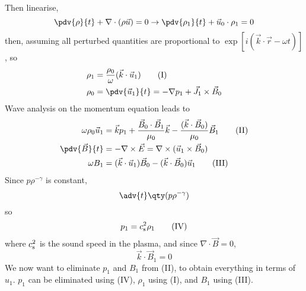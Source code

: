 \documentclass{book}         		                %
\begin{document}
Then linearise,
\[ \pdv{\rho}{t} + \nabla \cdot (\rho \vec{u}) = 0 \to \pdv{\rho_1}{t}
+ \vec{u}_0 \cdot \rho_1 = 0 \] then, assuming all perturbed
quantities are proportional to $\exp[ i(\vec{k} \cdot \vec{r} - \omega
t)]$, so
\begin{align*}
  \rho_1 &= \frac{\rho_0}{\omega} (\vec{k} \cdot \vec{u}_1) \tag{I} \\
\rho_0 &= \pdv{\vec{u}_1}{t} = - \nabla p_1 + \vec{J}_1 \times \vec{B}_0 
\end{align*}
Wave analysis on the momentum equation leads to
\begin{align*}
  \omega \rho_0 \vec{u}_1 &= \vec{k} p_1 + \frac{\vec{B}_0 \cdot \vec{B}_1}{\mu_0} \vec{k} - \frac{(\vec{k} \cdot \vec{B}_0)}{\mu_0} \vec{B}_1 \tag{II} \\
\pdv{\vec{B}}{t} &= - \nabla \times \vec{E} = \nabla \times (\vec{u}_1 \times \vec{B}_0) \\
\omega B_1 &= ( \vec{k} \cdot \vec{u}_1) \vec{B}_0 - (\vec{k} \cdot \vec{B}_0 ) \vec{u}_1 \tag{III} \\
\end{align*}
Since $p \rho^{-\gamma}$ is constant,
\[ \adv{t} \qty( p \rho^{-\gamma} ) \]
so
\begin{equation*}
  p_1 = c_{\rm s}^2\rho_1 \tag{IV}
\end{equation*}
where $c_{\rm s}^2$ is the sound speed in the plasma, and since $\nabla \cdot \vec{B} = 0$,
\begin{equation*}
  \vec{k} \cdot \vec{B}_1 = 0 \tag{V}
\end{equation*}
We now want to eliminate $p_1$ and $B_1$ from (II), to obtain
everything in terms of $u_1$. $p_1$ can be eliminated using (IV),
$\rho_1$ using (I), and $B_1$ using (III).
\end{document}
